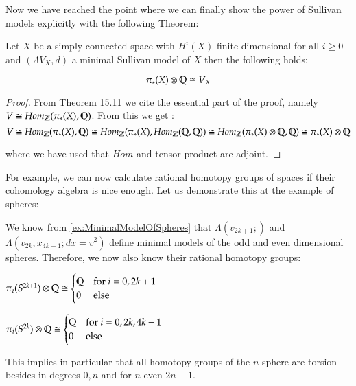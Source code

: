 Now we have reached the point where we can finally show the power of Sullivan models explicitly with the following Theorem:

\begin{Theorem}
\label{thm:MainTheoremOfRationalHomotopyTheory}
 Let $X$ be a simply connected space with $H^i(X)$ finite dimensional for all $i \geq 0$ and 
 $(\Lambda V_X, d)$ a minimal Sullivan model of $X$ then the following holds:
 
 $$ \pi_*(X) \otimes \mathbb{Q} \cong V_X$$
\end{Theorem}

\begin{proof}
 From  \cite{Felix2001} Theorem 15.11 we cite the essential part of the proof, namely $V \cong Hom_{\mathbb{Z}}(\pi_*(X), \mathbb{Q})$. 
 From this we get :
 $$ V \cong Hom_{\mathbb{Z}}(\pi_*(X), \mathbb{Q}) \cong Hom_{\mathbb{Z}}(\pi_*(X), Hom_{\mathbb{Z}}(\mathbb{Q}, \mathbb{Q})) \cong 
  Hom_{\mathbb{Z}}(\pi_*(X) \otimes \mathbb{Q}, \mathbb{Q}) \cong \pi_*(X) \otimes \mathbb{Q}$$
  
  where we have used that $Hom$ and tensor product are adjoint.
\end{proof}

For example, we can now calculate rational homotopy groups of spaces if their cohomology algebra is nice enough. Let us
demonstrate this at the example of spheres:


\begin{Example}
 We know from \ref{ex:MinimalModelOfSpheres} that $\Lambda(v_{2k+1};)$ and $\Lambda(v_{2k}, x_{4k -1}; dx = v^2)$
 define minimal models of the odd and even dimensional spheres. Therefore, we now also know their rational homotopy groups:
 
 \begin{multicols}{2}
  $\pi_i(S^{2k+1}) \otimes \mathbb{Q} \cong
  \begin{cases}
  \mathbb{Q}  	&\text{for $i = 0, 2k+1$} \\
  0 	&\text{else}
  \end{cases}
  $
  
  \columnbreak
  
  $\pi_i(S^{2k}) \otimes \mathbb{Q} \cong
  \begin{cases}
  \mathbb{Q}  	&\text{for $i = 0, 2k, 4k -1 $} \\
  0 	&\text{else}
  \end{cases}
  $
 \end{multicols}
This implies in particular that all homotopy groups of the $n$-sphere are torsion besides in degrees $0, n$
and for $n$ even $2n -1$.
\end{Example}

